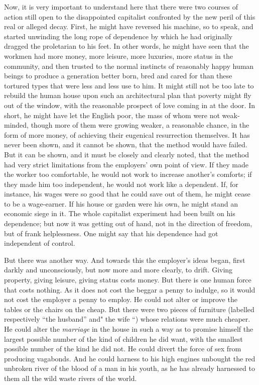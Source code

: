 \documentclass{book}
\begin{document}
Now, it is very important to understand here that there were two courses of action still open to the disappointed capitalist confronted by the new peril of this real or alleged decay. First, he might have reversed his machine, so to speak, and started unwinding the long rope of dependence by which he had originally dragged the proletarian to his feet. In other words, he might have seen that the workmen had more money, more leisure, more luxuries, more status in the community, and then trusted to the normal instincts of reasonably happy human beings to produce a generation better born, bred and cared for than these tortured types that were less and less use to him. It might still not be too late to rebuild the human house upon such an architectural plan that poverty might fly out of the window, with the reasonable prospect of love coming in at the door. In short, he might have let the English poor, the mass of whom were not weak-minded, though more of them were growing weaker, a reasonable chance, in the form of more money, of achieving their eugenical resurrection themselves. It has never been shown, and it cannot be shown, that the method would have failed. But it can be shown, and it must be closely and clearly noted, that the method had very strict limitations from the employers’ own point of view. If they made the worker too comfortable, he would not work to increase another’s comforts; if they made him too independent, he would not work like a dependent. If, for instance, his wages were so good that he could save out of them, he might cease to be a wage-earner. If his house or garden were his own, he might stand an economic siege in it. The whole capitalist experiment had been built on his dependence; but now it was getting out of hand, not in the direction of freedom, but of frank helplessness. One might say that his dependence had got independent of control.

But there was another way. And towards this the employer’s ideas began, first darkly and unconsciously, but now more and more clearly, to drift. Giving property, giving leisure, giving status costs money. But there is one human force that costs nothing. As it does not cost the beggar a penny to indulge, so it would not cost the employer a penny to employ. He could not alter or improve the tables or the chairs on the cheap. But there were two pieces of furniture (labelled respectively “the husband” and" the wife “) whose relations were much cheaper. He could alter the \emph{marriage} in the house in such a way as to promise himself the largest possible number of the kind of children he did want, with the smallest possible number of the kind he did not. He could divert the force of sex from producing vagabonds. And he could harness to his high engines unbought the red unbroken river of the blood of a man in his youth, as he has already harnessed to them all the wild waste rivers of the world.
\end{document}
